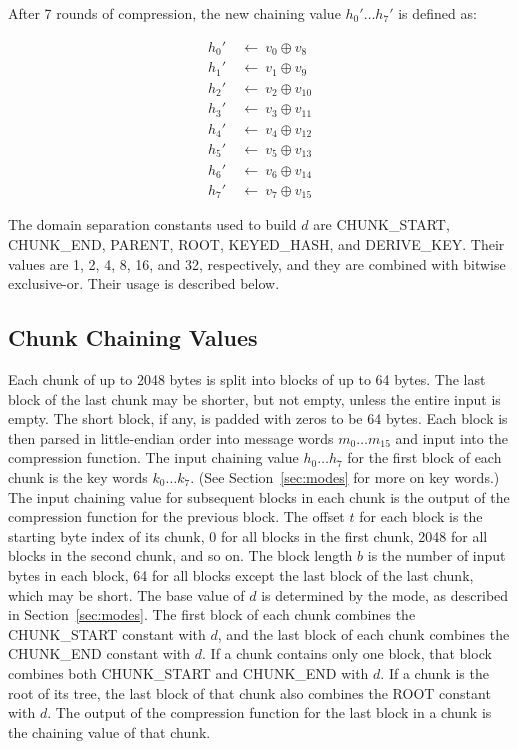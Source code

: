 \documentclass[11pt,notitlepage,a4paper]{article}
\begin{document}
After 7 rounds of compression, the new chaining value $h_{0}' \ldots h_{7}'$ is
defined as:

\begin{align*}
    h_{0}' \ & \leftarrow \ v_{0} \oplus  v_{8} \\
    h_{1}' \ & \leftarrow \ v_{1} \oplus  v_{9} \\
    h_{2}' \ & \leftarrow \ v_{2} \oplus  v_{10} \\
    h_{3}' \ & \leftarrow \ v_{3} \oplus  v_{11} \\
    h_{4}' \ & \leftarrow \ v_{4} \oplus  v_{12} \\
    h_{5}' \ & \leftarrow \ v_{5} \oplus  v_{13} \\
    h_{6}' \ & \leftarrow \ v_{6} \oplus  v_{14} \\
    h_{7}' \ & \leftarrow \ v_{7} \oplus  v_{15}
\end{align*}

The domain separation constants used to build $d$ are CHUNK\_START, CHUNK\_END,
PARENT, ROOT, KEYED\_HASH, and DERIVE\_KEY. Their values are 1, 2, 4, 8, 16,
and 32, respectively, and they are combined with bitwise exclusive-or. Their
usage is described below.

\subsection{Chunk Chaining Values}\label{sec:chunk}

Each chunk of up to 2048 bytes is split into blocks of up to 64 bytes. The last
block of the last chunk may be shorter, but not empty, unless the entire input
is empty. The short block, if any, is padded with zeros to be 64 bytes. Each
block is then parsed in little-endian order into message words $m_{0} \ldots
m_{15}$ and input into the compression function. The input chaining value
$h_{0} \ldots h_{7}$ for the first block of each chunk is the key words $k_{0}
\ldots k_{7}$. (See Section~\ref{sec:modes} for more on key words.) The input
chaining value for subsequent blocks in each chunk is the output of the
compression function for the previous block. The offset $t$ for each block is
the starting byte index of its chunk, 0 for all blocks in the first chunk, 2048
for all blocks in the second chunk, and so on. The block length $b$ is the
number of input bytes in each block, 64 for all blocks except the last block of
the last chunk, which may be short. The base value of $d$ is determined by the
mode, as described in Section~\ref{sec:modes}. The first block of each chunk
combines the CHUNK\_START constant with $d$, and the last block of each chunk
combines the CHUNK\_END constant with $d$. If a chunk contains only one block,
that block combines both CHUNK\_START and CHUNK\_END with $d$. If a chunk is
the root of its tree, the last block of that chunk also combines the ROOT
constant with $d$. The output of the compression function for the last block in
a chunk is the chaining value of that chunk.
\end{document}
